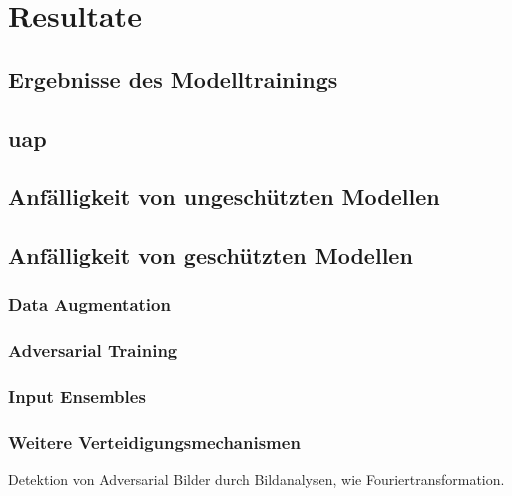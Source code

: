 \section{Resultate}


\subsection{Ergebnisse des Modelltrainings}

\subsection{\acrlong{uap}}

\subsection{Anfälligkeit von ungeschützten Modellen}

\subsection{Anfälligkeit von geschützten Modellen}

\subsubsection{Data Augmentation}

\subsubsection{Adversarial Training}

\subsubsection{Input Ensembles}

\subsubsection{Weitere Verteidigungsmechanismen}

Detektion von Adversarial Bilder durch Bildanalysen, wie Fouriertransformation. 

